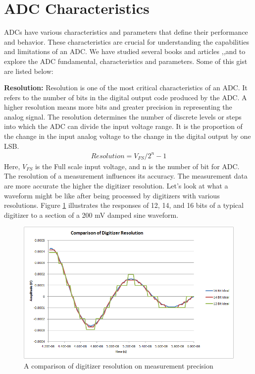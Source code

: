 \section{ADC Characteristics}
ADCs have various characteristics and parameters that define their performance and behavior.  These characteristics are crucial for understanding the capabilities and limitations of an ADC. We have studied several books and articles \cite{ADC_Param},\cite{Acquistion_Eren},and \cite{DAQ_Fundamental} to explore the ADC fundamental, characteristics and parameters. Some of this gist are listed below:
\vspace{1\baselineskip}\par 
\textbf{Resolution:} Resolution is one of the most critical characteristics of an ADC. It refers to the number of bits in the digital output code produced by the ADC. A higher resolution means more bits and greater precision in representing the analog signal. The resolution determines the number of discrete levels or steps into which the ADC can divide the input voltage range. It is the proportion of the change in the input analog voltage to the change in the digital output by one LSB.
\begin{align}
    Resolution = V_{FS} / 2^n -1
\end{align}
Here, $V_{FS}$ is the Full scale input voltage, and n is the number of bit for ADC.
The resolution of a measurement influences its accuracy. The measurement data are more accurate the higher the digitizer resolution. Let's look at what a waveform might be like after being processed by digitizers with various resolutions. Figure \ref{fig:x Resolution Comparison} illustrates the responses of 12, 14, and 16 bits of a typical digitizer to a section of a 200 mV damped sine waveform.

\begin{figure}[htbp]
\centering
\includegraphics[scale=0.4]{images/Resolution.png}
\caption{A comparison of digitizer resolution on measurement precision}
\label{fig:x Resolution Comparison}
\end{figure}

